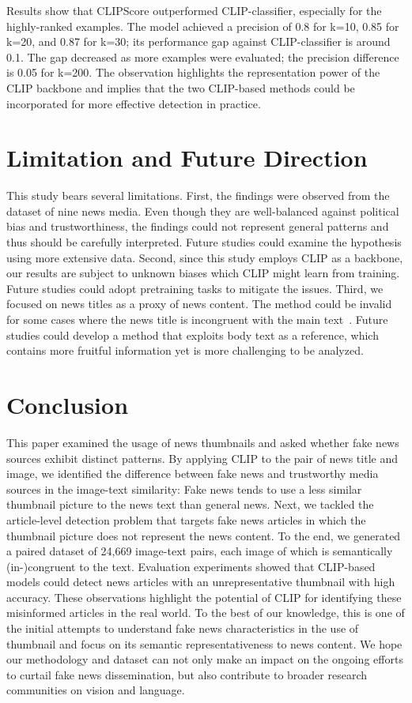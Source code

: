 \documentclass[11pt]{article}
\begin{document}
Results show that CLIPScore outperformed CLIP-classifier, especially for the highly-ranked examples. The model achieved a precision of 0.8 for k=10, 0.85 for k=20, and 0.87 for k=30; its performance gap against CLIP-classifier is around 0.1. The gap decreased as more examples were evaluated; the precision difference is 0.05 for k=200. The observation highlights the representation power of the CLIP backbone and implies that the two CLIP-based methods could be incorporated for more effective detection in practice. 

\section{Limitation and Future Direction}

This study bears several limitations. First, the findings were observed from the dataset of nine news media. Even though they are well-balanced against political bias and trustworthiness, the findings could not represent general patterns and thus should be carefully interpreted. Future studies could examine the hypothesis using more extensive data. Second, since this study employs CLIP as a backbone, our results are subject to unknown biases which CLIP might learn from training. Future studies could adopt pretraining tasks to mitigate the issues. Third, we focused on news titles as a proxy of news content. The method could be invalid for some cases where the news title is incongruent with the main text~\cite{yoon2019detecting}. Future studies could develop a method that exploits body text as a reference, which contains more fruitful information yet is more challenging to be analyzed.

\section{Conclusion}

This paper examined the usage of news thumbnails and asked whether fake news sources exhibit distinct patterns. By applying CLIP to the pair of news title and image, we identified the difference between fake news and trustworthy media sources in the image-text similarity: Fake news tends to use a less similar thumbnail picture to the news text than general news. Next, we tackled the article-level detection problem that targets fake news articles in which the thumbnail picture does not represent the news content. To the end, we generated a paired dataset of 24,669 image-text pairs, each image of which is semantically (in-)congruent to the text. Evaluation experiments showed that CLIP-based models could detect news articles with an unrepresentative thumbnail with high accuracy. These observations highlight the potential of CLIP for identifying these misinformed articles in the real world. To the best of our knowledge, this is one of the initial attempts to understand fake news characteristics in the use of thumbnail and focus on its semantic representativeness to news content. We hope our methodology and dataset can not only make an impact on the ongoing efforts to curtail fake news dissemination, but also contribute to broader research communities on vision and language. 
\end{document}
